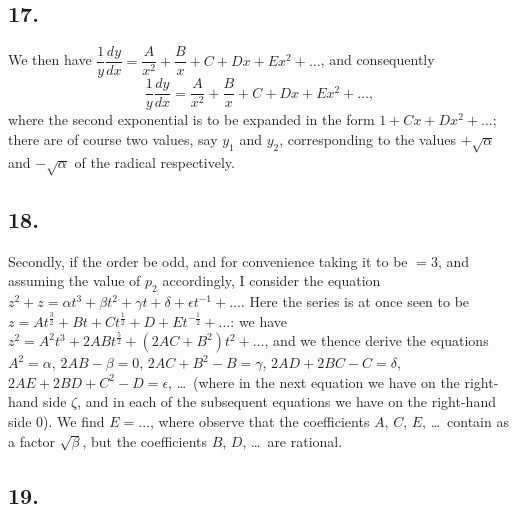 \documentclass[11pt,a4paper]{article}
\theoremstyle{definition}
\begin{document}
\subsection*{17.}

We then have $\dfrac{1}{y}\dfrac{dy}{dx} = \dfrac{A}{x^2} + \dfrac{B}{x} + C + Dx + Ex^2 + \ldots$, and consequently
\[
\frac{1}{y}\frac{dy}{dx} = \frac{A}{x^2} + \frac{B}{x} + C + Dx + Ex^2 + \ldots,
\]
where the second exponential is to be expanded in the form $1 + Cx + Dx^2 + \ldots$; there are of course two values, say $y_1$ and $y_2$, corresponding to the values $+\sqrt{\alpha}$ and $-\sqrt{\alpha}$ of the radical respectively.

\subsection*{18.}

Secondly, if the order be odd, and for convenience taking it to be $= 3$, and assuming the value of $p_2$ accordingly, I consider the equation $z^2 + z = \alpha t^3 + \beta t^2 + \gamma t + \delta + \epsilon t^{-1} + \ldots$. Here the series is at once seen to be $z = At^{\frac{3}{2}} + Bt + Ct^{\frac{1}{2}} + D + Et^{-\frac{1}{2}} + \ldots$: we have $z^2 = A^2 t^3 + 2AB t^{\frac{5}{2}} + (2AC + B^2)t^2 + \ldots$, and we thence derive the equations $A^2 = \alpha$, $2AB - \beta = 0$, $2AC + B^2 - B = \gamma$, $2AD + 2BC - C = \delta$, $2AE + 2BD + C^2 - D = \epsilon$, \ldots\ (where in the next equation we have on the right-hand side $\zeta$, and in each of the subsequent equations we have on the right-hand side $0$). We find $E = \ldots$, where observe that the coefficients $A$, $C$, $E$, \ldots\ contain as a factor $\sqrt{\beta}$, but the coefficients $B$, $D$, \ldots\ are rational.

\subsection*{19.}
\end{document}
